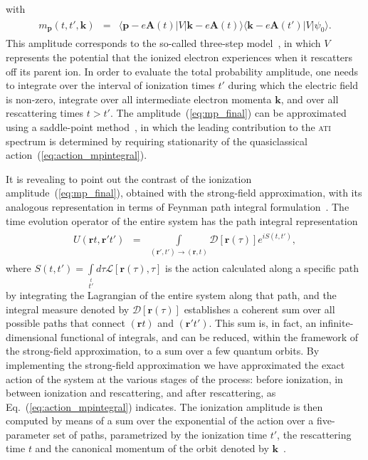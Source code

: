 %
with
%
\begin{eqnarray}
  \label{eq:mp_braketfunction}
  \begin{split}
    m_{\mathbf{p}}(t, t', \mathbf{k}) & = &
    \langle \mathbf{p} - e\mathbf{A}(t) | V |
    \mathbf{k} - e\mathbf{A}(t) \rangle 
    \langle \mathbf{k} - e\mathbf{A}(t') | V |
    \psi_{0} \rangle.
  \end{split}
\end{eqnarray}
%
This amplitude corresponds to the so-called three-step
model~\cite{Becker_ati2002}, in which $V$ represents the potential
that the ionized electron experiences when it rescatters off its
parent ion. In order to evaluate the total probability amplitude, one
needs to integrate over the interval of ionization times $t'$ during
which the electric field is non-zero, integrate over all intermediate
electron momenta $\mathbf{k}$, and over all rescattering times $t >
t'$. The amplitude~(\ref{eq:mp_final}) can be approximated using a
saddle-point method~\cite{Lewenstein_1995}, in which the leading
contribution to the \textsc{ati} spectrum is determined by requiring
stationarity of the quasiclassical
action~(\ref{eq:action_mpintegral}).


It is revealing to point out the contrast of the ionization
amplitude~(\ref{eq:mp_final}), obtained with the strong-field
approximation, with its analogous representation in terms of Feynman
path integral formulation~\cite{RevModPhysFeynman}. The time evolution
operator of the entire system has the path integral representation
\begin{eqnarray}
\label{eq:te_path}
\begin{split}
U(\mathbf{r}t, \mathbf{r}'t') & = &
\int\limits_{(\mathbf{r}',t')\to(\mathbf{r},t)}
\mathcal{D}\left[ \mathbf{r}(\tau) \right] e^{i S(t, t')},
\end{split}
\end{eqnarray}
where $S(t, t') = \int\limits_{t'}\limits^{t} d\tau
\mathcal{L}[\mathbf{r}(\tau), \tau]$ is the action calculated along a
specific path by integrating the Lagrangian of the entire system along
that path, and the integral measure denoted by $\mathcal{D}\left[
  \mathbf{r}(\tau) \right]$ establishes a coherent sum over all
possible paths that connect $(\mathbf{r}t)$ and
$(\mathbf{r}'t')$. This sum is, in fact, an infinite-dimensional
functional of integrals, and can be reduced, within the framework of
the strong-field approximation, to a sum over a few quantum orbits. By
implementing the strong-field approximation we have approximated the
exact action of the system at the various stages of the process:
before ionization, in between ionization and rescattering, and after
rescattering, as Eq.~(\ref{eq:action_mpintegral}) indicates. The
ionization amplitude is then computed by means of a sum over the
exponential of the action over a five-parameter set of paths,
parametrized by the ionization time $t'$, the rescattering time $t$
and the canonical momentum of the orbit denoted by
$\mathbf{k}$~\cite{KopoldOptComm2000}.

